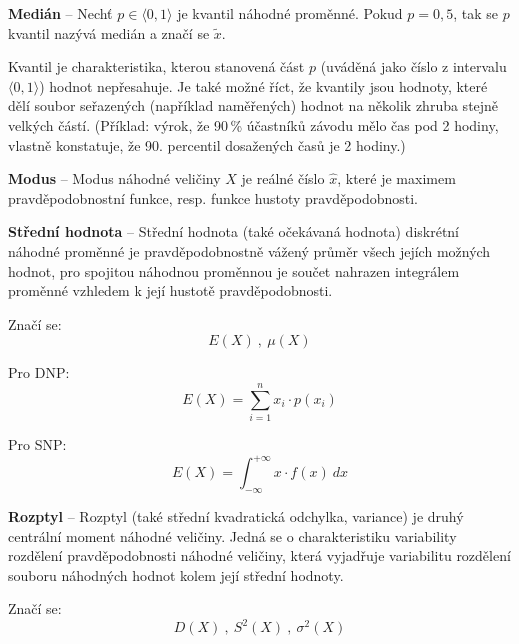 \begin{compactitem}
    \item \textbf{Medián} -- Nechť $p \in \langle 0, 1\rangle$ je kvantil náhodné proměnné. Pokud $p = 0,5$, tak se $p$ kvantil nazývá medián a značí se $\tilde{x}$.  \begin{compactitem}

        \item Kvantil je charakteristika, kterou stanovená část $p$ (uváděná jako číslo z intervalu $\langle 0, 1\rangle$) hodnot nepřesahuje. Je také možné říct, že kvantily jsou hodnoty, které dělí soubor seřazených (například naměřených) hodnot na několik zhruba stejně velkých částí. (Příklad: výrok, že 90\,\% účastníků závodu mělo čas pod 2 hodiny, vlastně konstatuje, že 90. percentil dosažených časů je 2 hodiny.)
    \end{compactitem}

    \item \textbf{Modus} -- Modus náhodné veličiny $X$ je reálné číslo $\hat{x}$, které je maximem pravděpodobnostní funkce, resp. funkce hustoty pravděpodobnosti.

    \item \textbf{Střední hodnota} -- Střední hodnota (také očekávaná hodnota) diskrétní náhodné proměnné je pravděpodobnostně vážený průměr všech jejích možných hodnot, pro spojitou náhodnou proměnnou je součet nahrazen integrálem proměnné vzhledem k její hustotě pravděpodobnosti. \begin{compactitem}
        \item Značí se:
        $$ E(X) ~,~ \mu(X) $$

        \item Pro DNP:
        $$ E(X) = \sum_{i = 1}^n x_i \cdot p(x_i) $$

        \item Pro SNP:
        $$ E(X) = \int_{- \infty}^{+ \infty} x \cdot f(x) ~ dx $$
    \end{compactitem}

    \item \textbf{Rozptyl} -- Rozptyl (také střední kvadratická odchylka, variance) je druhý centrální moment náhodné veličiny. Jedná se o charakteristiku variability rozdělení pravděpodobnosti náhodné veličiny, která vyjadřuje variabilitu rozdělení souboru náhodných hodnot kolem její střední hodnoty. \begin{compactitem}
        \item Značí se:
        $$ D(X) ~,~ S^2(X) ~,~ \sigma^2(X) $$


\end{compactitem}
\end{compactitem}
